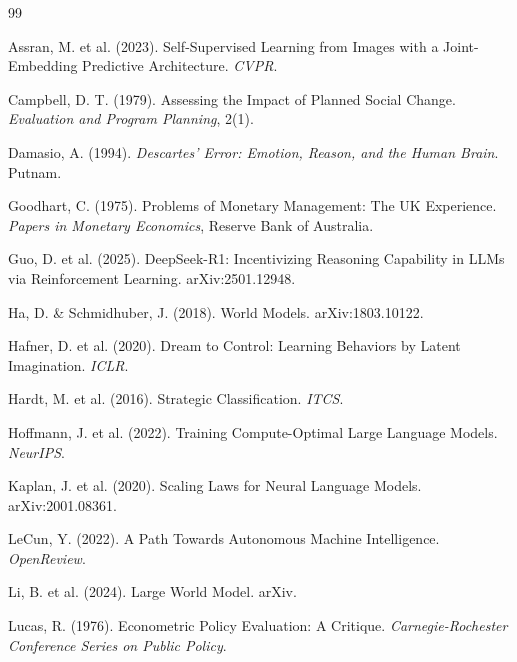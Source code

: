 \documentclass[11pt,a4paper]{article}
\begin{document}



\begin{thebibliography}{99}

Assran, M. et al. (2023).
Self-Supervised Learning from Images with a Joint-Embedding Predictive Architecture.
\textit{CVPR}.

Campbell, D. T. (1979).
Assessing the Impact of Planned Social Change.
\textit{Evaluation and Program Planning}, 2(1).

Damasio, A. (1994).
\textit{Descartes' Error: Emotion, Reason, and the Human Brain}. Putnam.

Goodhart, C. (1975).
Problems of Monetary Management: The UK Experience.
\textit{Papers in Monetary Economics}, Reserve Bank of Australia.

Guo, D. et al. (2025).
DeepSeek-R1: Incentivizing Reasoning Capability in LLMs via Reinforcement Learning.
arXiv:2501.12948.

Ha, D. \& Schmidhuber, J. (2018).
World Models.
arXiv:1803.10122.

Hafner, D. et al. (2020).
Dream to Control: Learning Behaviors by Latent Imagination.
\textit{ICLR}.

Hardt, M. et al. (2016).
Strategic Classification.
\textit{ITCS}.

Hoffmann, J. et al. (2022).
Training Compute-Optimal Large Language Models.
\textit{NeurIPS}.

Kaplan, J. et al. (2020).
Scaling Laws for Neural Language Models.
arXiv:2001.08361.

LeCun, Y. (2022).
A Path Towards Autonomous Machine Intelligence.
\textit{OpenReview}.

Li, B. et al. (2024).
Large World Model.
arXiv.

Lucas, R. (1976).
Econometric Policy Evaluation: A Critique.
\textit{Carnegie-Rochester Conference Series on Public Policy}.


\end{thebibliography}
\end{document}
